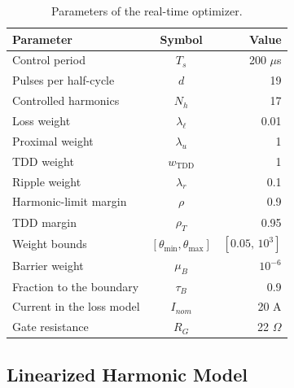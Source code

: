 \documentclass[conference]{IEEEtran}
\begin{document}
\begin{table}[!t]
    \centering
    \caption{Parameters of the real-time optimizer.}
    \bgroup
    \def\arraystretch{1.0}
    \setlength{\tabcolsep}{4pt}
    \begin{tabular*}{\columnwidth}{@{\extracolsep{\fill}}lcr@{}}
        \toprule
        \rowcolor{Gray}
        Parameter & Symbol & Value \\ \midrule
        Control period             & $T_s$                 & 200 $\mu$s \\
        Pulses per half-cycle      & $d$                   & 19 \\
        Controlled harmonics       & $N_h$                 & 17 \\
        Loss weight                & $\lambda_{\ell}$      & 0.01 \\
        Proximal weight            & $\lambda_u$           & 1 \\
        TDD weight                 & $w_{\mathrm{TDD}}$    & 1 \\
        Ripple weight              & $\lambda_r$           & 0.1 \\
        Harmonic-limit margin      & $\rho$                & 0.9 \\
        TDD margin                 & $\rho_T$              & 0.95 \\
        Weight bounds              & $[\theta_{\min},\theta_{\max}]$
                                   & $[0.05,\,10^3]$ \\
        Barrier weight             & $\mu_B$               & $10^{-6}$ \\
        Fraction to the boundary   & $\tau_B$              & 0.9 \\
        Current in the loss model  & $I_{nom}$             & 20 A \\
        Gate resistance            & $R_G$                 & 22 $\Omega$ \\
        \bottomrule
    \end{tabular*}
    \egroup
    \label{tab:rt_param}
\end{table}

\subsection{Linearized Harmonic Model}
\label{subsec:rt_lin}
\end{document}

